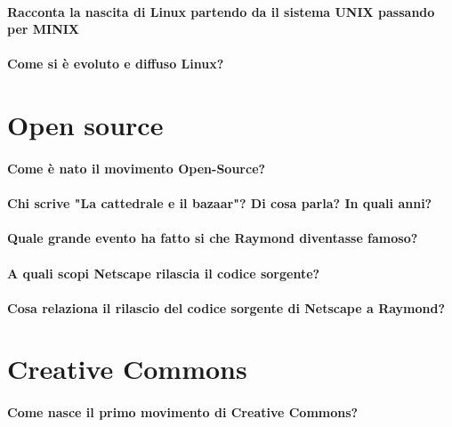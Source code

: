 \documentclass[a4paper]{article}
\begin{document}
	\paragraph{Racconta la nascita di Linux partendo da il sistema UNIX passando per MINIX}
	
	\paragraph{Come si è evoluto e diffuso Linux?}
	
	
	\section{Open source}
	
	\paragraph{Come è nato il movimento Open-Source?}
	
	\paragraph{Chi scrive "La cattedrale e il bazaar"? Di cosa parla? In quali anni?}
	
	\paragraph{Quale grande evento ha fatto si che Raymond diventasse famoso?}
	
	\paragraph{A quali scopi Netscape rilascia il codice sorgente?}
	
	\paragraph{Cosa relaziona il rilascio del codice sorgente di Netscape a Raymond?}
	
	
	\section{Creative Commons}
	
	\paragraph{Come nasce il primo movimento di Creative Commons?}
	
\end{document}
